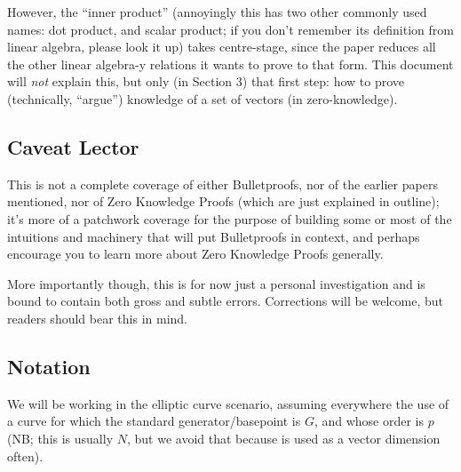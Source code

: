 \documentclass[10pt,a4paper]{article}
\begin{document}
However, the ``inner product'' (annoyingly this has two other commonly
used names: dot product, and scalar product; if you don't remember its
definition from linear algebra, please look it up) takes centre-stage,
since the paper reduces all the other linear algebra-y relations it
wants to prove to that form. This document will \emph{not} explain this,
but only (in Section 3) that first step: how to prove (technically,
``argue'') knowledge of a set of vectors (in zero-knowledge).

\hypertarget{caveat-lector}{%
\subsection[Caveat
Lector]{\texorpdfstring{\protect\hypertarget{anchor-10}{}{}Caveat
Lector}{Caveat Lector}}\label{caveat-lector}}

This is not a complete coverage of either Bulletproofs, nor of the
earlier papers mentioned, nor of Zero Knowledge Proofs (which are just
explained in outline); it's more of a patchwork coverage for the purpose
of building some or most of the intuitions and machinery that will put
Bulletproofs in context, and perhaps encourage you to learn more about
Zero Knowledge Proofs generally.

More importantly though, this is for now just a personal investigation
and is bound to contain both gross and subtle errors. Corrections will
be welcome, but readers should bear this in mind.

\hypertarget{notation}{%
\subsection[Notation]{\texorpdfstring{\protect\hypertarget{anchor-11}{}{}Notation}{Notation}}\label{notation}}

We will be working in the elliptic curve scenario, assuming everywhere
the use of a curve for which the standard generator/basepoint is $G$, and
whose order is $p$(NB; this is usually $N$, but we avoid that because is used
as a vector dimension often).
\end{document}
